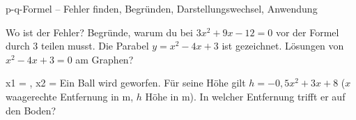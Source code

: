 \begin{aufgabe}{p-q-Formel – Fehler finden, Begründen, Darstellungswechsel, Anwendung}
\begin{teile}
\teil Wo ist der Fehler? 
\teil Begründe, warum du bei $3x^2 + 9x - 12 = 0$ vor der Formel durch $3$ teilen musst.
\teil Die Parabel $y = x^2 - 4x + 3$ ist gezeichnet. Lösungen von $x^2 - 4x + 3 = 0$ am Graphen?

\begin{ksys}[xmin=-2,xmax=6,ymin=-2,ymax=5,ablesen]  \end{ksys}
x1 = \leerfeld , x2 = \leerfeld
\teil Ein Ball wird geworfen. Für seine Höhe gilt $h = -0{,}5x^2 + 3x + 8$ ($x$ waagerechte Entfernung in m, $h$ Höhe in m). In welcher Entfernung trifft er auf den Boden? \leerfeld[m]
\end{teile}
\end{aufgabe}
